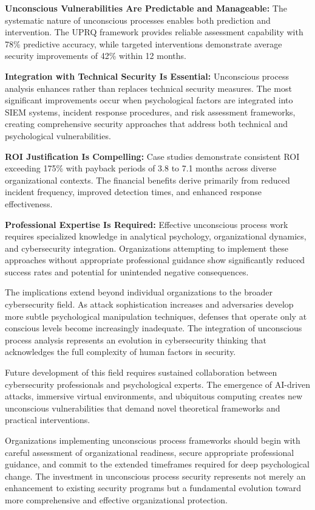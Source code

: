 \documentclass[11pt,a4paper]{article}
\begin{document}
\textbf{Unconscious Vulnerabilities Are Predictable and Manageable:} The systematic nature of unconscious processes enables both prediction and intervention. The UPRQ framework provides reliable assessment capability with 78\% predictive accuracy, while targeted interventions demonstrate average security improvements of 42\% within 12 months.

\textbf{Integration with Technical Security Is Essential:} Unconscious process analysis enhances rather than replaces technical security measures. The most significant improvements occur when psychological factors are integrated into SIEM systems, incident response procedures, and risk assessment frameworks, creating comprehensive security approaches that address both technical and psychological vulnerabilities.

\textbf{ROI Justification Is Compelling:} Case studies demonstrate consistent ROI exceeding 175\% with payback periods of 3.8 to 7.1 months across diverse organizational contexts. The financial benefits derive primarily from reduced incident frequency, improved detection times, and enhanced response effectiveness.

\textbf{Professional Expertise Is Required:} Effective unconscious process work requires specialized knowledge in analytical psychology, organizational dynamics, and cybersecurity integration. Organizations attempting to implement these approaches without appropriate professional guidance show significantly reduced success rates and potential for unintended negative consequences.

The implications extend beyond individual organizations to the broader cybersecurity field. As attack sophistication increases and adversaries develop more subtle psychological manipulation techniques, defenses that operate only at conscious levels become increasingly inadequate. The integration of unconscious process analysis represents an evolution in cybersecurity thinking that acknowledges the full complexity of human factors in security.

Future development of this field requires sustained collaboration between cybersecurity professionals and psychological experts. The emergence of AI-driven attacks, immersive virtual environments, and ubiquitous computing creates new unconscious vulnerabilities that demand novel theoretical frameworks and practical interventions.

Organizations implementing unconscious process frameworks should begin with careful assessment of organizational readiness, secure appropriate professional guidance, and commit to the extended timeframes required for deep psychological change. The investment in unconscious process security represents not merely an enhancement to existing security programs but a fundamental evolution toward more comprehensive and effective organizational protection.
\end{document}
